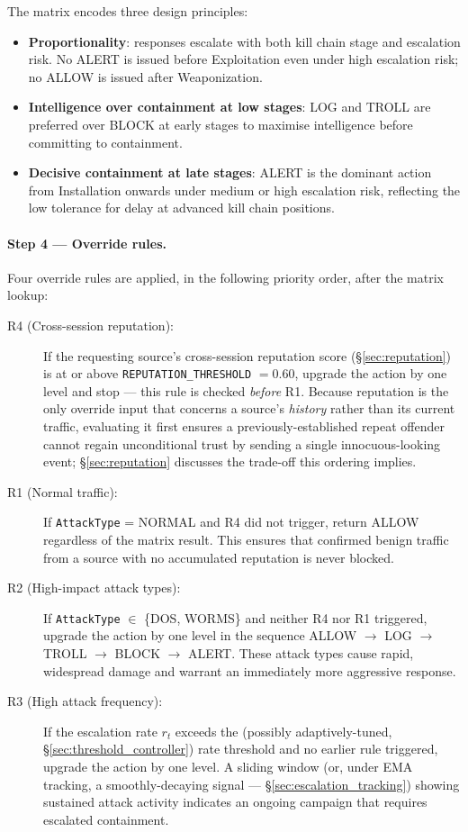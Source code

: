 The matrix encodes three design principles:
%
\begin{itemize}
  \item \textbf{Proportionality}: responses escalate with both kill chain
        stage and escalation risk. No ALERT is issued before Exploitation
        even under high escalation risk; no ALLOW is issued after
        Weaponization.
  \item \textbf{Intelligence over containment at low stages}: LOG and TROLL
        are preferred over BLOCK at early stages to maximise intelligence
        before committing to containment.
  \item \textbf{Decisive containment at late stages}: ALERT is the
        dominant action from Installation onwards under medium or high
        escalation risk, reflecting the low tolerance for delay at advanced
        kill chain positions.
\end{itemize}

\paragraph{Step 4 — Override rules.}
Four override rules are applied, in the following priority order, after the
matrix lookup:
%
\begin{description}
  \item[R4 (Cross-session reputation):]
        If the requesting source's cross-session reputation score
        (\S\ref{sec:reputation}) is at or above \texttt{REPUTATION\_THRESHOLD}
        $= 0.60$, upgrade the action by one level and stop — this rule is
        checked \emph{before} R1. Because reputation is the only override
        input that concerns a source's \emph{history} rather than its
        current traffic, evaluating it first ensures a previously-established
        repeat offender cannot regain unconditional trust by sending a single
        innocuous-looking event; \S\ref{sec:reputation} discusses the
        trade-off this ordering implies.
  \item[R1 (Normal traffic):]
        If \texttt{AttackType} = NORMAL and R4 did not trigger, return ALLOW
        regardless of the matrix result. This ensures that confirmed benign
        traffic from a source with no accumulated reputation is never
        blocked.
  \item[R2 (High-impact attack types):]
        If \texttt{AttackType} $\in$ \{DOS, WORMS\} and neither R4 nor R1
        triggered, upgrade the action by one level in the sequence
        ALLOW $\to$ LOG $\to$ TROLL $\to$ BLOCK $\to$ ALERT.
        These attack types cause rapid, widespread damage and warrant
        an immediately more aggressive response.
  \item[R3 (High attack frequency):]
        If the escalation rate $r_t$ exceeds the (possibly
        adaptively-tuned, \S\ref{sec:threshold_controller}) rate threshold
        and no earlier rule triggered, upgrade the action by one level.
        A sliding window (or, under EMA tracking, a smoothly-decaying
        signal — \S\ref{sec:escalation_tracking}) showing sustained attack
        activity indicates an ongoing campaign that requires escalated
        containment.
\end{description}

